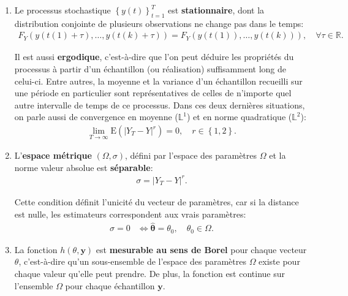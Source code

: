 \begin{enumerate}
\item Le processus stochastique $\left\{y(t) \right\}_{t=1}^T$ est
  \textbf{stationnaire}, dont la distribution conjointe de plusieurs
  observations ne change pas dans le temps:
  \begin{align}
    \label{eq:conditionGMM1.1}
    F_{Y}(y({t(1)+\tau}) ,\ldots, y({t(k)+\tau})) =
    F_{Y}(y({t(1)}),\ldots, y({t(k)})), \quad \forall \tau \in
    \mathbb{R}.
  \end{align}
  
  Il est aussi \textbf{ergodique}, c'est-à-dire que l'on peut déduire
  les propriétés du processus à partir d'un échantillon (ou
  réalisation) suffisamment long de celui-ci. Entre autres, la moyenne
  et la variance d'un échantillon recueilli sur une période en
  particulier sont représentatives de celles de n'importe quel autre
  intervalle de temps de ce processus. Dans ces deux dernières
  situations, on parle aussi de convergence en moyenne
  ($\mathbb{L}^1$) et en norme quadratique ($\mathbb{L}^2$):
  \begin{align}
    \label{eq:conditionGMM1.2}
    \lim_{T\longrightarrow\infty}\mathrm{E}\left(\left|Y_T-Y\right|^r\right)=0,
    \quad r\in\left\{1,2\right\}.
  \end{align}

\item L'\textbf{espace métrique} $(\Omega,\sigma)$, défini par
  l'espace des paramètres $\Omega$ et la norme valeur absolue est
  \textbf{séparable}:
  \begin{align}
    \label{eq:conditionGMM2.1}
    \sigma=\left|Y_T-Y\right|^r.
  \end{align}

  Cette condition définit l'unicité du vecteur de paramètres, car si
  la distance est nulle, les estimateurs correspondent aux vrais paramètres:
  \begin{align}
    \label{eq:conditionGMM2.2}
    \sigma = 0 &\Longleftrightarrow \mathbf{\hat\theta} = \theta_0,
    \quad \theta_0 \in \Omega.
  \end{align}

\item La fonction $h\left(\theta,\mathbf{y}\right)$ est
  \textbf{mesurable au sens de Borel} pour chaque vecteur $\theta$,
  c'est-à-dire qu'un sous-ensemble de l'espace des paramètres $\Omega$
  existe pour chaque valeur qu'elle peut prendre. De plus, la fonction
  est continue sur l'ensemble $\Omega$ pour chaque échantillon
  $\mathbf{y}$.


\end{enumerate}
